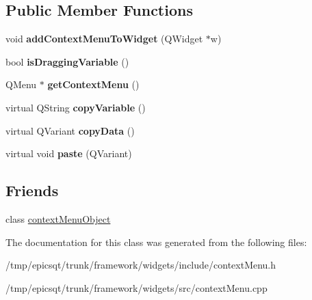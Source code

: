 \subsection*{Public Member Functions}
\begin{DoxyCompactItemize}
\item 
\hypertarget{classcontextMenu_aa999ab4c184150fe9cd7ae196ba4a4b2}{
void {\bfseries addContextMenuToWidget} (QWidget $\ast$w)}
\label{classcontextMenu_aa999ab4c184150fe9cd7ae196ba4a4b2}

\item 
\hypertarget{classcontextMenu_a4d897e1a47d145a524c0d4c1e377c159}{
bool {\bfseries isDraggingVariable} ()}
\label{classcontextMenu_a4d897e1a47d145a524c0d4c1e377c159}

\item 
\hypertarget{classcontextMenu_adafa3f64e846f80d832f0529c6f2e0ec}{
QMenu $\ast$ {\bfseries getContextMenu} ()}
\label{classcontextMenu_adafa3f64e846f80d832f0529c6f2e0ec}

\item 
\hypertarget{classcontextMenu_a4d115deb65fdb2034f4b42f075cb7c51}{
virtual QString {\bfseries copyVariable} ()}
\label{classcontextMenu_a4d115deb65fdb2034f4b42f075cb7c51}

\item 
\hypertarget{classcontextMenu_a69b0308f474ce677da4257581e928e41}{
virtual QVariant {\bfseries copyData} ()}
\label{classcontextMenu_a69b0308f474ce677da4257581e928e41}

\item 
\hypertarget{classcontextMenu_a2e3107c7d83692cff31cdcd669be14b3}{
virtual void {\bfseries paste} (QVariant)}
\label{classcontextMenu_a2e3107c7d83692cff31cdcd669be14b3}

\end{DoxyCompactItemize}
\subsection*{Friends}
\begin{DoxyCompactItemize}
\item 
\hypertarget{classcontextMenu_a034bc826cc430068d488b68c8ca8c4e4}{
class \hyperlink{classcontextMenu_a034bc826cc430068d488b68c8ca8c4e4}{contextMenuObject}}
\label{classcontextMenu_a034bc826cc430068d488b68c8ca8c4e4}

\end{DoxyCompactItemize}


The documentation for this class was generated from the following files:\begin{DoxyCompactItemize}
\item 
/tmp/epicsqt/trunk/framework/widgets/include/contextMenu.h\item 
/tmp/epicsqt/trunk/framework/widgets/src/contextMenu.cpp\end{DoxyCompactItemize}
